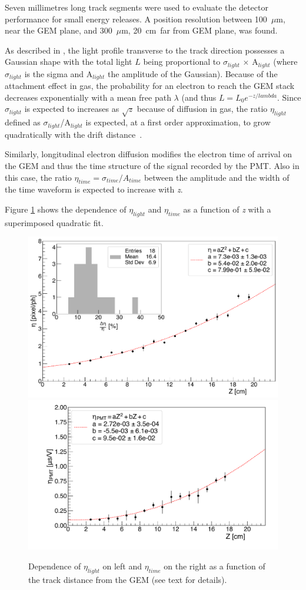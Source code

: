 \documentclass[physics,article,submit,moreauthors,pdftex]{Definitions/mdpi}
\newcommand{\keV}{\ensuremath{\,\textrm{keV}}\xspace}
\begin{document}
Seven millimetres long track segments were used to evaluate the detector performance for small energy releases. 
A position resolution between 100~$\mu$m, near the GEM plane, and 300~$\mu$m, 20~cm~far from GEM plane, was found.


As described in \cite{bib:Antochi_2021}, the light profile transverse to the track direction possesses a Gaussian shape with the total light $L$ being proportional to $\sigma_{light}$ $\times$ A$_{light}$ (where $\sigma_{light}$ is the sigma and A$_{light}$ the amplitude of the Gaussian).
Because of the attachment effect in gas, the probability for an electron to reach the GEM stack decreases exponentially with a mean free path $\lambda$ (and thus $L = L_0 e^{-z/lambda}$. Since $\sigma_{light}$ is expected to increases as $\sqrt{z}$ because of diffusion in gas, the ratio $\eta_{light}$ defined as $\sigma_{light}$/A$_{light}$ is expected, at a first order approximation, to grow quadratically with the drift distance~\cite{bib:lemon_btf}.

Similarly, longitudinal electron diffusion modifies the electron time of arrival on the GEM and thus the time structure of the signal recorded by the PMT. Also in this case, the ratio $\eta_{time} = \sigma_{time}/A_{time}$ between the amplitude and the width of the time waveform is expected to increase with {\it z}.


Figure \ref{fig:eta} shows the dependence of $\eta_{light}$ and $\eta_{time}$ as a function of {\it z} with a superimposed quadratic fit. 

\begin{figure}
\centering
\includegraphics[width=.31\textwidth]{Fig9-eta-CMOS-Z.pdf}
\includegraphics[width=.34\textwidth]{Fig10-eta-PMT-Z.pdf}
\caption{Dependence of $\eta_{light}$ on left and $\eta_{time}$ on the right as a function of the track distance from the GEM (see text for details).}
\label{fig:eta}
\end{figure}
\end{document}
